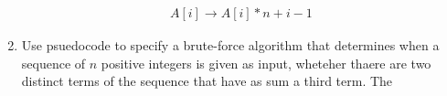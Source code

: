 \documentclass[12pt]{report}
\begin{document}
\begin{enumerate}[label=\arabic*.]
{\begin{equation*}
	\begin{aligned}
		A[i] \rightarrow A[i]*n+i-1
	\end{aligned}
	\end{equation*}}
	\item Use psuedocode to specify a brute-force algorithm that determines when a sequence of $n$ positive integers is given as input, wheteher thaere are two distinct terms of the sequence that have as sum a third term. The
\end{enumerate}
\end{document}
